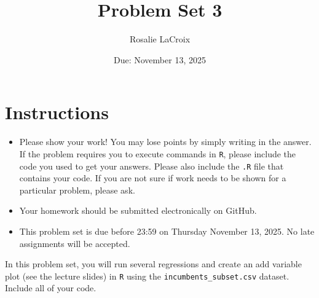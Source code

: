 \documentclass[12pt,letterpaper]{article}
\title{Problem Set 3}
\date{Due: November 13, 2025}
\author{Rosalie LaCroix}
\begin{document}
	\maketitle
	\section*{Instructions}
	\begin{itemize}
		\item Please show your work! You may lose points by simply writing in the answer. If the problem requires you to execute commands in \texttt{R}, please include the code you used to get your answers. Please also include the \texttt{.R} file that contains your code. If you are not sure if work needs to be shown for a particular problem, please ask.
		\item Your homework should be submitted electronically on GitHub.
		\item This problem set is due before 23:59 on Thursday November 13, 2025. No late assignments will be accepted.
		
	\end{itemize}
	
	\vspace{.25cm}
	
	\noindent In this problem set, you will run several regressions and create an add variable plot (see the lecture slides) in \texttt{R} using the \texttt{incumbents\_subset.csv} dataset. Include all of your code.
	
	\vspace{.5cm}
\end{document}
